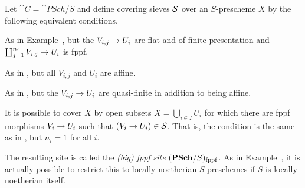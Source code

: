 \documentclass[a4paper,parskip=half,numbers=enddot, DIV=12]{scrreprt}
\begin{document}
\begin{example}
	Let $\cat C=\cat{PSch}/S$ and define covering sieves $\mathcal{S}$ over an $S$-prescheme $X$ by the following equivalent conditions.
	\begin{alphanumerate}
		\item As in Example~, but the $V_{i,j}\morphism U_i$ are flat and of finite presentation and $\coprod_{j=1}^{n_i}V_{i,j}\morphism U_i$ is fppf.
		\item As in , but all $V_{i,j}$ and $U_i$ are affine.
		\item As in , but the $V_{i,j}\morphism U_i$ are quasi-finite in addition to being affine.
		\item It is possible to cover $X$ by open subsets $X=\bigcup_{i\in I}U_i$ for which there are fppf morphisms $V_i\morphism U_i$ such that $(V_i\morphism U_i)\in \Ss$. That is, the condition is the same as in , but $n_i=1$ for all $i$.
	\end{alphanumerate}
	The resulting site is called the \emph{(big) fppf site} $(\cat{PSch}/S)_\fppf$. As in Example~, it is actually possible to restrict this to locally noetherian $S$-preschemes if $S$ is locally noetherian itself.
\end{example}
\end{document}
